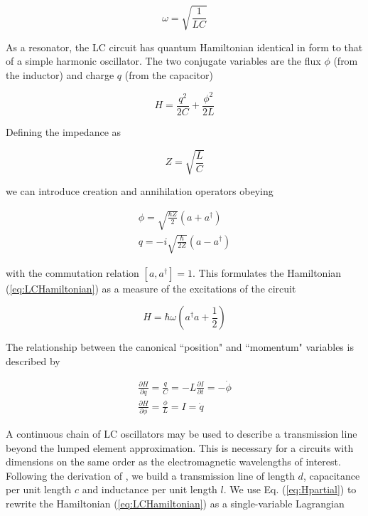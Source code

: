 \documentclass[12 pt]{book}
\begin{document}
\begin{equation}
\omega = \sqrt{\frac{1}{LC}}
\end{equation}

As a resonator, the LC circuit has quantum Hamiltonian identical in form to that of a simple harmonic oscillator. The two conjugate variables are the flux $\phi$ (from the inductor) and charge $q$ (from the capacitor)

\begin{equation}\label{eq:LCHamiltonian}
H=\frac{q^2}{2C}+\frac{\phi^2}{2L}
\end{equation}

Defining the impedance as

\begin{equation}
Z=\sqrt{\frac{L}{C}}
\end{equation}

we can introduce creation and annihilation operators obeying 

\begin{eqnarray}
\phi=\sqrt{\frac{\hbar Z}{2}}\left(a+a^\dag\right) \\
q=-i\sqrt{\frac{\hbar}{2Z}}\left(a-a^\dag\right)
\end{eqnarray}

with the commutation relation $[a,a^\dag]=1$. This formulates the Hamiltonian (\ref{eq:LCHamiltonian}) as a measure of the excitations of the circuit

\begin{equation}\label{eq:SHO}
H=\hbar \omega\left(a^\dag a + \frac{1}{2}\right)
\end{equation}

The relationship between the canonical ``position" and ``momentum" variables is described by 

\begin{eqnarray}
\frac{\partial H}{\partial q}=\frac{q}{C}=-L\frac{\partial I}{\partial t}=-\dot{\phi} \label{eq:Hpartial}\\
\frac{\partial H}{\partial \phi}=\frac{\phi}{L}=I=\dot{q}
\end{eqnarray}

A continuous chain of LC oscillators may be used to describe a transmission line beyond the lumped element approximation\cite{Pozar}. This is necessary for a circuits with dimensions on the same order as the electromagnetic wavelengths of interest. Following the derivation of \cite{Bishop}, we build a transmission line of length $d$, capacitance per unit length $c$ and inductance per unit length $l$. We use Eq. (\ref{eq:Hpartial}) to rewrite the Hamiltonian (\ref{eq:LCHamiltonian}) as a single-variable Lagrangian
\end{document}
